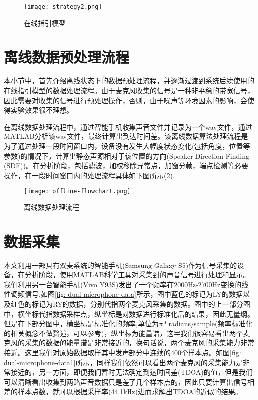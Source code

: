 \documentclass[winfonts,oneside]{njuthesis}
\begin{document}
		\begin{figure}[H]
			\centering
			\texttt{[image: strategy2.png]} 
			\caption{在线指引模型}
			\label{fig: strategy2}
		\end{figure}
		
	
	\section{离线数据预处理流程}
	
		本小节中，首先介绍离线状态下的数据预处理流程，并逐渐过渡到系统后续使用的在线指引模型的数据处理流程。由于麦克风收集的信号是一种非平稳的带宽信号，因此需要对收集的信号进行预处理操作，否则，由于噪声等环境因素的影响，会使得实验效果很不理想。
		
		在离线数据处理流程中，通过智能手机收集声音文件并记录为一个wav文件，通过MATLAB分析该wav文件，最终计算出到达时间差。该离线数据算法处理流程是为了通过处理一段时间窗口内，设备没有发生大幅度状态变化(包括角度，位置等参数)的情况下，计算出静态声源相对于该位置的方向(Speaker Direction Finding (SDF))。在分析阶段，包括滤波，加权移除异常点，加窗分帧，端点检测等必要操作，在一段时间窗口内的处理流程具体如下图所示(\ref{fig: offline-flowchart}).
		
		\begin{figure}[H]
			\centering
			\texttt{[image: offline-flowchart.png]} 
			\caption{离线数据处理流程}
			\label{fig: offline-flowchart}
		\end{figure}
	
	\section{数据采集}
	
		本文利用一部具有双麦系统的智能手机(Samsung Galaxy S5)作为信号采集的设备，在分析阶段，使用MATLAB科学工具对采集到的声音信号进行处理和显示。我们利用另一台智能手机(Vivo Y93S)发出了一个频率在2000Hz-2700Hz变换的线性调频信号,如图\ref{fig: dual-microphone-data}所示，图中蓝色的标记为LY的数据以及红色的标记为RY的数据，分别代指两个麦克风采集的数据。图中的上一部分图中，横坐标代指数据采样点，纵坐标是对数据进行标准化后的结果，因此无量纲。但是在下部分图中，横坐标是标准化的频率,单位为$\pi * $radians/sample(频率标准化的相关概念不做赘述，可以参考\cite{Normalized_frequency})，纵坐标为能量谱，这里我们很容易看出两个麦克风的采集的数据的能量谱是非常接近的，换句话说，两个麦克风的采集能力非常接近。这里我们对原始数据取样其中发声部分中连续的400个样本点。如图\ref{fig: dual-microphone-data1}所示，同样我们依然可以看出两个麦克风的采集能力是非常接近的，另一方面，即便我们暂时无法确定到达时间差(TDOA)的值，但是我们可以清晰看出收集到两路声音数据只是差了几个样本点的，因此只要计算出信号相差的样本点数，就可以根据采样率(44.1kHz)进而求解出TDOA的近似的结果。
		
\end{document}
